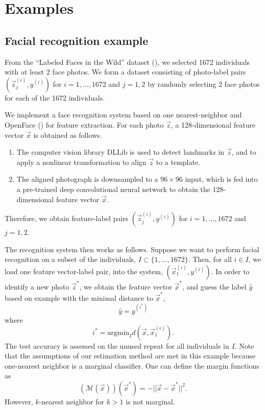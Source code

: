 \section{Examples}\label{sec:extrapolation_example}

\subsection{Facial recognition example}

From the ``Labeled Faces in the Wild'' dataset (\cite{LFWTech}), we
selected 1672 individuals with at least 2 face photos.  We form a
dataset consisting of photo-label pairs $(\vec{z}_j^{(i)}, y^{(i)})$
for $i = 1,\hdots, 1672$ and $j = 1,2$ by randomly selecting 2 face
photos for each of the 1672 individuals.

We implement a face recognition system based on one nearest-neighbor
and OpenFace (\cite{amos2016openface}) for feature extraction.  For
each photo $\vec{z}$, a 128-dimensional feature vector $\vec{x}$ is
obtained as follows.
\begin{enumerate}
\item The computer vision library DLLib is used to detect landmarks in
  $\vec{z}$, and to apply a nonlinear transformation to align
  $\vec{z}$ to a template.
\item The aligned photograph is downsampled to a $96 \times 96$ input,
  which is fed into a pre-trained deep convolutional neural network to
  obtain the 128-dimensional feature vector $\vec{x}$.
\end{enumerate}
Therefore, we obtain feature-label pairs $(\vec{z}_j^{(i)}, y^{(i)})$
for $i = 1,\hdots, 1672$ and $j = 1,2$.

The recognition system then works as follows.  Suppose we want to
perform facial recognition on a subset of the individuals, $I \subset
\{1,\hdots, 1672\}$.  Then, for all $i \in I$, we load one feature
vector-label pair, into the system, $(\vec{x}_1^{(i)}, y^{(i)})$.  In
order to identify a new photo $\vec{z}^*$, we obtain the feature
vector $\vec{x}^*$, and guess the label $\hat{y}$ based on example
with the minimal distance to $\vec{x}^*$,
\[
\hat{y} = y^{(i^*)}
\]
where
\[
i^* = \text{argmin}_I d(\vec{x}, \vec{x}_1^{(i)}).
\]
The test accuracy is assessed on the unused repeat for all individuals
in $I$.  Note that the assumptions of our estimation method are met in
this example because one-nearest neighbor is a marginal classifier.
One can define the margin functions as
\[
(\mathcal{M}(\vec{x}))(\vec{x}^*) = -||\vec{x} - \vec{x}^*||^2.
\]
However, $k$-nearest neighbor for $k > 1$ is not marginal.

